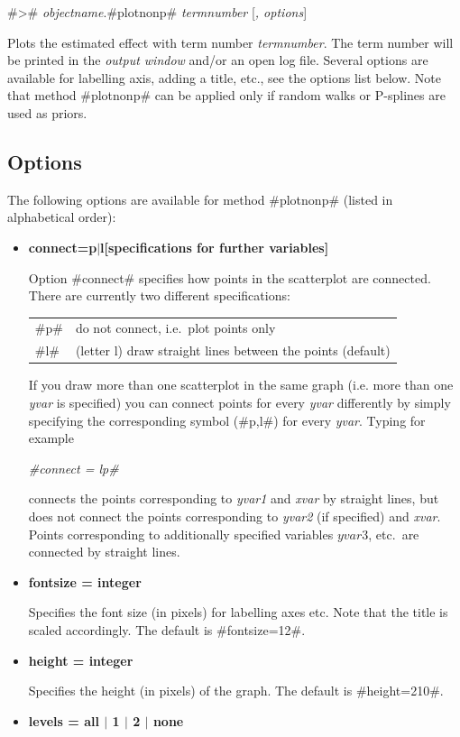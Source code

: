 #># {\em objectname}.#plotnonp# {\em termnumber} [{\em , options}]


Plots the estimated effect with term number {\em termnumber}. The
term number will be printed in the {\em output window} and/or an
open log file. Several options are available for labelling axis,
adding a title, etc., see the options list below. Note that method
#plotnonp# can be applied only if random walks or P-splines are
used as priors.

\subsection*{Options}

The following options are available for method #plotnonp# (listed
in alphabetical order):

\begin{itemize}
\item {\bf connect=p$|$l[specifications for further variables]}

Option #connect# specifies how points in the scatterplot are
connected. There are currently two different specifications:

\begin{tabular}{ll}
#p# & do not connect, i.e.~plot points only \\
#l# & (letter l) draw straight lines between the points (default)
\end{tabular}

If you draw more than one scatterplot in the same graph (i.e. more
than one {\em yvar} is specified) you can connect points for every
{\em yvar} differently by simply specifying the corresponding
symbol (#p,l#) for every {\em yvar}. Typing for example

{\em #connect = lp#}

connects the points corresponding to {\em yvar1} and {\em xvar} by
straight lines, but does not connect the points corresponding to
{\em yvar2} (if specified) and {\em xvar}. Points corresponding to
additionally specified variables $yvar3$, etc.~are connected by
straight lines.
\item {\bf fontsize = integer}

Specifies the font size (in pixels) for labelling axes etc. Note
that the title is scaled accordingly. The default is
#fontsize=12#.
\item {\bf height = integer}

Specifies the height (in pixels) of the graph. The default is
#height=210#.
\item {\bf levels = all $|$ 1 $|$ 2 $|$ none}


\end{itemize}
